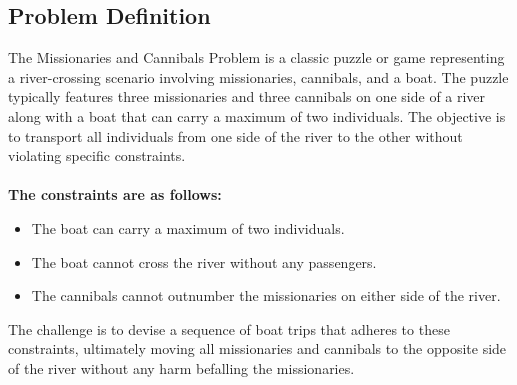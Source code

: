 \documentclass[12pt]{article}
\begin{document}
\subsection{Problem Definition}
The Missionaries and Cannibals Problem is a classic puzzle or game representing a river-crossing scenario involving missionaries, 
cannibals, and a boat. The puzzle typically features three missionaries and three cannibals on one side of a river along with a 
boat that can carry a maximum of two individuals. The objective is to transport all individuals from one side of the river 
to the other without violating specific constraints.
\\\\
\textbf{The constraints are as follows:}
    \begin{itemize}
        \item The boat can carry a maximum of two individuals.
        \item The boat cannot cross the river without any passengers.
        \item The cannibals cannot outnumber the missionaries on either side of the river.
    \end{itemize}
The challenge is to devise a sequence of boat trips that adheres to these constraints, ultimately moving all missionaries and cannibals to the opposite side of the river without any harm befalling the missionaries.
\end{document}
